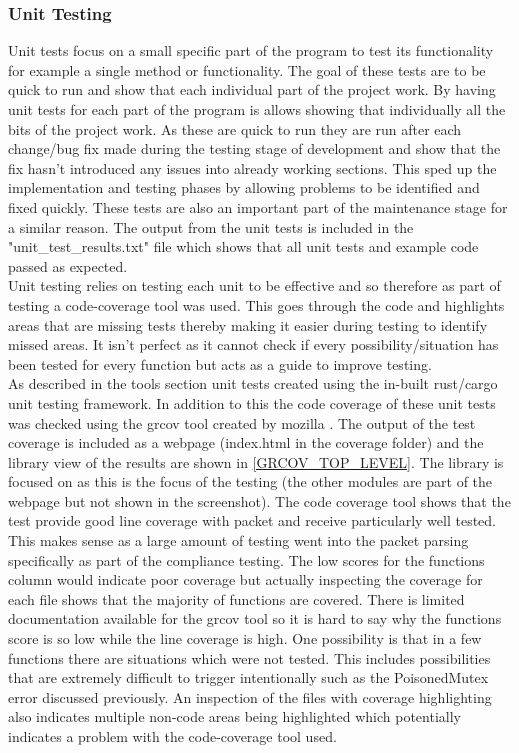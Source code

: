 \documentclass[11pt,a4paper]{article}
\begin{document}
\subsubsection{Unit Testing}
Unit tests focus on a small specific part of the program to test its functionality for example a single method or functionality. The goal of these tests are to be quick to run and show that each individual part of the project work. By having unit tests for each part of the program is allows showing that individually all the bits of the project work. As these are quick to run they are run after each change/bug fix made during the testing stage of development and show that the fix hasn't introduced any issues into already working sections. This sped up the implementation and testing phases by allowing problems to be identified and fixed quickly. These tests are also an important part of the maintenance stage for a similar reason. The output from the unit tests is included in the "unit\_test\_results.txt" file which shows that all unit tests and example code passed as expected.\\

Unit testing relies on testing each unit to be effective and so therefore as part of testing a code-coverage tool was used. This goes through the code and highlights areas that are missing tests thereby making it easier during testing to identify missed areas. It isn't perfect as it cannot check if every possibility/situation has been tested for every function but acts as a guide to improve testing.\\

As described in the tools section unit tests created using the in-built rust/cargo unit testing framework. In addition to this the code coverage of these unit tests was checked using the grcov tool created by mozilla \cite{GRCOV}. The output of the test coverage is included as a webpage (index.html in the coverage folder) and the library view of the results are shown in \ref{GRCOV_TOP_LEVEL}. The library is focused on as this is the focus of the testing (the other modules are part of the webpage but not shown in the screenshot). The code coverage tool shows that the test provide good line coverage with packet and receive particularly well tested. This makes sense as a large amount of testing went into the packet parsing specifically as part of the compliance testing. The low scores for the functions column would indicate poor coverage but actually inspecting the coverage for each file shows that the majority of functions are covered. There is limited documentation available for the grcov tool so it is hard to say why the functions score is so low while the line coverage is high. One possibility is that in a few functions there are situations which were not tested. This includes possibilities that are extremely difficult to trigger intentionally such as the PoisonedMutex error discussed previously. An inspection of the files with coverage highlighting also indicates multiple non-code areas being highlighted which potentially indicates a problem with the code-coverage tool used.
\end{document}
